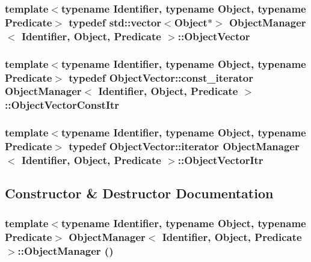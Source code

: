 \subsubsection[{ObjectVector}]{\setlength{\rightskip}{0pt plus 5cm}template$<$typename Identifier, typename Object, typename Predicate$>$ typedef std::vector$<$Object$\ast$$>$ {\bf ObjectManager}$<$ Identifier, Object, Predicate $>$::{\bf ObjectVector}}\label{classObjectManager_aa4fcbaee3d2516a6334f08fff837c7be}
\subsubsection[{ObjectVectorConstItr}]{\setlength{\rightskip}{0pt plus 5cm}template$<$typename Identifier, typename Object, typename Predicate$>$ typedef ObjectVector::const\_\-iterator {\bf ObjectManager}$<$ Identifier, Object, Predicate $>$::{\bf ObjectVectorConstItr}}\label{classObjectManager_acff0ec2b138b2dc0a2ad6b80c7dc1482}
\subsubsection[{ObjectVectorItr}]{\setlength{\rightskip}{0pt plus 5cm}template$<$typename Identifier, typename Object, typename Predicate$>$ typedef ObjectVector::iterator {\bf ObjectManager}$<$ Identifier, Object, Predicate $>$::{\bf ObjectVectorItr}}\label{classObjectManager_a64d7341e2e8152cd114ab2fbd66a237e}


\subsection{Constructor \& Destructor Documentation}
\subsubsection[{ObjectManager}]{\setlength{\rightskip}{0pt plus 5cm}template$<$typename Identifier, typename Object, typename Predicate$>$ {\bf ObjectManager}$<$ Identifier, Object, Predicate $>$::{\bf ObjectManager} ()\hspace{0.3cm}{\ttfamily  [inline]}}\label{classObjectManager_af32caa02e21da2fba152097615c00e60}


